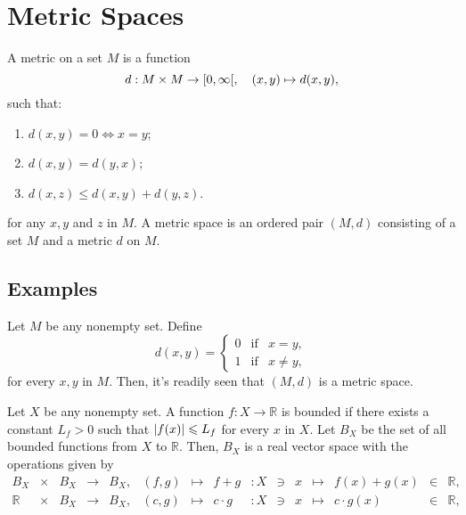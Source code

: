 \section{Metric Spaces}\label{sec:metric-spaces}

\begin{definition}\label{def:metric-space}
  A metric on a set $ M $ is a function
  \[
    d:M\times{M}\to\rinterval{0}{\infty},\quad(x,y)\mapsto{d(x,y)},
  \]
  such that:
  \begin{enumerate}
    \item
      $ d(x,y)=0\iff{x=y} $;
    \item
      $ d(x,y)=d(y,x) $;
    \item
      $ d(x,z) \leqslant d(x,y) + d(y,z) $.
  \end{enumerate}
  for any $ x,y $ and $ z $ in $ M $. A metric space is an ordered pair $ (M,d) $ consisting of a set $ M $ and a metric $ d $ on $ M $.
\end{definition}

\subsection{Examples}\label{ssec:examples}

\begin{example}\label{ex:zero-one}
  Let $ M $ be any nonempty set. Define
  \[
    d(x,y)
    =
    \left\{\begin{array}{ccc}
      0 & \text{if} & x=y, \\
      1 & \text{if} & x\neq{y},
    \end{array}\right.
  \]
  for every $ x,y $ in $ M $. Then, it's readily seen that $ (M,d) $ is a metric space.
\end{example}

\begin{example}\label{ex:bouded-functions}
  Let $ X $ be any nonempty set. A function $ f:X\to\mathbb{R} $ is bounded if there exists a constant $ L_{f} > 0 $ such that $ \lvert f(x)\rvert \leqslant L_{f} $ for every $ x $ in $ X $. Let $ B_{X} $ be the set of all bounded functions from $ X $ to $ \mathbb{R} $. Then, $ B_{X} $ is a real vector space with the operations given by
  \[
    \begin{array}{rlllllllllllcll}
      B_{X}      & \times & {B_{X}} & \to & B_{X}, & (f,g) & \mapsto & f+g       & :X & \owns & x & \mapsto & f(x)+g(x)    & \in & \mathbb{R}, \\
      \mathbb{R} & \times & {B_{X}} & \to & B_{X}, & (c,g) & \mapsto & c\cdot{g} & :X & \owns & x & \mapsto & c\cdot{g(x)} & \in & \mathbb{R},
    \end{array}
  \]
\end{example}
